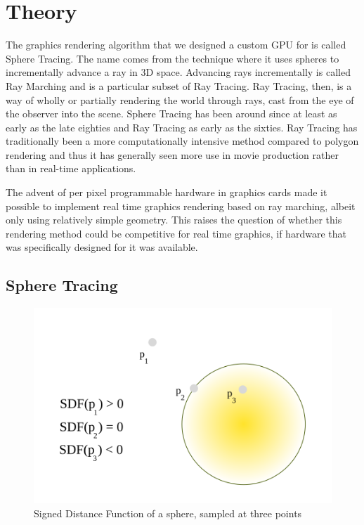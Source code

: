 \chapter{Theory}


	The graphics rendering algorithm that we designed a custom GPU for is called
	Sphere Tracing\cite{Hart1996}. The name comes from the technique where it 
	uses spheres to incrementally advance a ray in 3D space. Advancing rays 
	incrementally is called Ray Marching and is a particular subset of Ray
	Tracing.\cite{Whitted1980} Ray Tracing, then, is a way of wholly or
	partially rendering the world through rays, cast from the eye of the
	observer into the scene. Sphere Tracing has been around since at least as
	early as the late eighties and Ray Tracing as early as the
	sixties\cite{Hart1989,Appel1968}. Ray Tracing has traditionally been a 
	more computationally intensive method compared to polygon
	rendering\cite{Wylie1967} and thus it has generally seen more use in movie  
	production rather than in real-time applications.\cite{ref_needed?} 
	
	The advent of per pixel programmable hardware in graphics cards made it 
	possible to implement real time graphics rendering based on ray	marching, 
	albeit only using relatively simple geometry. This raises the question of 
	whether this rendering method could be competitive for real time graphics, 
	if hardware that was specifically designed for it was available.
	
		
	\section{Sphere Tracing} 

		\begin{figure}
			\begin{flushright}
				\includegraphics[width=0.9\linewidth]{figure/SDF} 
			\end{flushright}
			\caption{ Signed Distance Function of a sphere, sampled at three points}
			\vspace{40pt}
		\end{figure}
		
